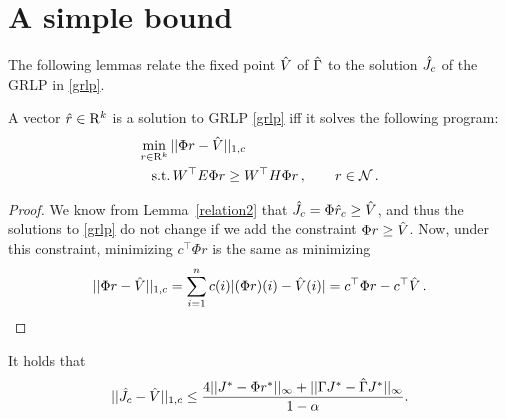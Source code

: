 \section{A simple bound}
The following lemmas relate the fixed point $\hat{V}$ of $\hat{\Gamma}$ to the solution $\hat{J}_c$ of the GRLP in \eqref{grlp}.
\begin{lemma}\label{srw}
A vector
$\hat{r} \in \mathrm{R}^k$ is a solution to GRLP \eqref{grlp} iff it solves the following program:
\begin{align}\label{grlpeqprog}
\begin{split}
\min_{r\in \R^k}\, &||\Phi r-\hv||_{1,c}\\
\text{s.t.}\mb &\, W^\top E \Phi r\geq W^\top H \Phi r\,, \qquad r\in \N\,.
\end{split}
\end{align}
\end{lemma}
\begin{proof}
We know from Lemma~\ref{relation2} that $\hat{J}_c = \Phi \hat{r}_c \geq\hat{V}$, and thus
the solutions to \eqref{grlp} do not change if we add the constraint $\Phi r \ge \hat{V}$.
Now, under this constraint, minimizing $c^\top \Phi r$ is the same as
 minimizing 
\begin{align*}
||\Phi r-\hat{V}||_{1,c}=\sum_{i=1}^n c(i) |(\Phi r)(i)-\hat{V}(i)|=c^\top \Phi r-c^\top \hat{V}\,.
\end{align*} 
\end{proof}
\begin{theorem}\label{mt2}
It holds that
\begin{align}
||\hat{J}_c-\hat{V}||_{1,c}\leq\frac{4||J^*-\Phi r^*||_\infty+||\Gamma J^*-\hat{\Gamma} J^*||_\infty}{1-\alpha}.
\end{align}
\end{theorem}
